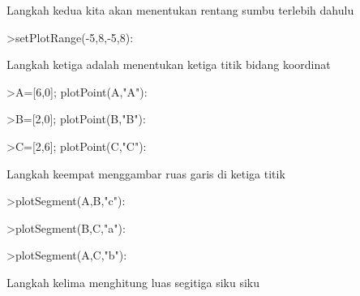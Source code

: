 \documentclass[a4paper,10pt]{article}
\begin{document}
\begin{eulernotebook}
\begin{eulercomment}
\begin{eulercomment}
\begin{eulercomment}
Langkah kedua kita akan menentukan rentang sumbu terlebih dahulu
\end{eulercomment}
\begin{eulerprompt}
>setPlotRange(-5,8,-5,8):
\end{eulerprompt}
\begin{eulercomment}
Langkah ketiga adalah menentukan ketiga titik bidang koordinat
\end{eulercomment}
\begin{eulerprompt}
>A=[6,0]; plotPoint(A,"A"):
\end{eulerprompt}
\begin{eulerprompt}
>B=[2,0]; plotPoint(B,"B"):
\end{eulerprompt}
\begin{eulerprompt}
>C=[2,6]; plotPoint(C,"C"):
\end{eulerprompt}
\begin{eulercomment}
Langkah keempat menggambar ruas garis di ketiga titik
\end{eulercomment}
\begin{eulerprompt}
>plotSegment(A,B,"c"):
\end{eulerprompt}
\begin{eulerprompt}
>plotSegment(B,C,"a"):
\end{eulerprompt}
\begin{eulerprompt}
>plotSegment(A,C,"b"):
\end{eulerprompt}
\begin{eulercomment}
Langkah kelima menghitung luas segitiga siku siku
\end{eulercomment}
\begin{eulerprompt}

\end{eulerprompt}
\end{eulercomment}
\end{eulercomment}
\end{eulernotebook}
\end{document}
